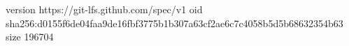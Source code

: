 version https://git-lfs.github.com/spec/v1
oid sha256:d0155f6de04faa9de16fbf3775b1b307a63cf2ae6c7c4058b5d5b68632354b63
size 196704

